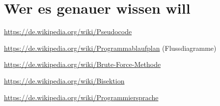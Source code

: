 \clearpage

\section{Wer es genauer wissen will}

\url{https://de.wikipedia.org/wiki/Pseudocode}

\url{https://de.wikipedia.org/wiki/Programmablaufplan} (Flussdiagramme)

\url{https://de.wikipedia.org/wiki/Brute-Force-Methode}

\url{https://de.wikipedia.org/wiki/Bisektion}

\url{https://de.wikipedia.org/wiki/Programmiersprache}

